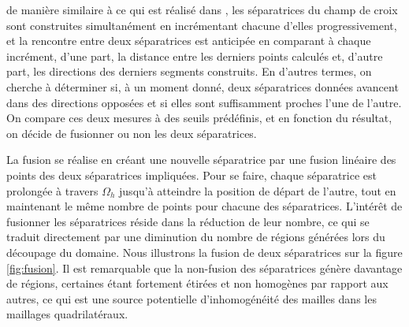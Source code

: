 de manière similaire à ce qui est réalisé dans \cite{marcon2019high}, les séparatrices du champ de croix sont construites simultanément en incrémentant chacune d'elles progressivement, et la rencontre entre deux séparatrices est anticipée en comparant à chaque incrément, d'une part, la distance entre les derniers points calculés et, d'autre part, les directions des derniers segments construits. En d'autres termes, on cherche à déterminer si, à un moment donné, deux séparatrices données avancent dans des directions opposées et si elles sont suffisamment proches l'une de l'autre. On compare ces deux mesures à des seuils prédéfinis, et en fonction du résultat, on décide de fusionner ou non les deux séparatrices.

La fusion se réalise en créant une nouvelle séparatrice par une fusion linéaire des points des deux séparatrices impliquées. Pour se faire, chaque séparatrice est prolongée à travers $\Omega_h$ jusqu'à atteindre la position de départ de l'autre, tout en maintenant le même nombre de points pour chacune des séparatrices. L'intérêt de fusionner les séparatrices réside dans la réduction de leur nombre, ce qui se traduit directement par une diminution du nombre de régions générées lors du découpage du domaine. Nous illustrons la fusion de deux séparatrices sur la figure \ref{fig:fusion}. Il est remarquable que la non-fusion des séparatrices génère davantage de régions, certaines étant fortement étirées et non homogènes par rapport aux autres, ce qui est une source potentielle d'inhomogénéité des mailles dans les maillages quadrilatéraux.


